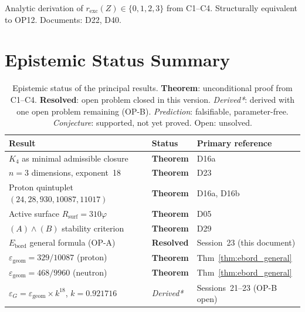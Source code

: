 \documentclass[12pt,a4paper]{article}
\theoremstyle{plain}
\theoremstyle{definition}
\theoremstyle{remark}
\newenvironment{openproblem}[1][]{%
  \begin{tcolorbox}[openproblemstyle,title={Open Problem\ifx\relax#1\relax\else: #1\fi}]}{\end{tcolorbox}}
\newcommand{\Kfour}{K_4}
\newcommand{\vp}{\varphi}
\newcommand{\Rsurf}{R_{\mathrm{surf}}}
\newcommand{\egeom}{\varepsilon_{\mathrm{geom}}}
\newcommand{\eG}{\varepsilon_G}
\begin{document}
\begin{openproblem}[OP14 --- Nuclear filling rates from axioms]
Analytic derivation of $r_{\mathrm{exc}}(Z)\in\{0,1,2,3\}$ from C1--C4. Structurally equivalent to OP12. Documents: D22, D40.
\end{openproblem}

\section{Epistemic Status Summary}
\label{sec:epistemic}

\begin{table}[H]
\centering
\caption{Epistemic status of the principal results. \textcolor{proofblue}{\textbf{Theorem}}: unconditional proof from C1--C4. \textcolor{resolvedgreen}{\textbf{Resolved}}: open problem closed in this version. \textit{Derived*}: derived with one open problem remaining (OP-B). \textit{Prediction}: falsifiable, parameter-free. \textcolor{conjecturegreen}{\textit{Conjecture}}: supported, not yet proved. \textcolor{openproblemred}{Open}: unsolved.}
\label{tab:epistemic}
\medskip
\begin{tabular}{>{\raggedright}p{7.2cm} p{2.0cm} p{5.0cm}}
\toprule
Result & Status & Primary reference \\
\midrule
$\Kfour$ as minimal admissible closure & \textcolor{proofblue}{\textbf{Theorem}} & D16a \\[2pt]
$n=3$ dimensions, exponent~18 & \textcolor{proofblue}{\textbf{Theorem}} & D23 \\[2pt]
Proton quintuplet $(24,28,930,10087,11017)$ & \textcolor{proofblue}{\textbf{Theorem}} & D16a, D16b \\[2pt]
Active surface $\Rsurf=310\vp$ & \textcolor{proofblue}{\textbf{Theorem}} & D05 \\[2pt]
$(A)\wedge(B)$ stability criterion & \textcolor{proofblue}{\textbf{Theorem}} & D29 \\[2pt]
$E_{\mathrm{bord}}$ general formula (OP-A) & \textcolor{resolvedgreen}{\textbf{Resolved}} & Session~23 (this document) \\[2pt]
$\egeom=329/10087$ (proton) & \textcolor{proofblue}{\textbf{Theorem}} & Thm~\ref{thm:ebord_general} \\[2pt]
$\egeom=468/9960$ (neutron) & \textcolor{proofblue}{\textbf{Theorem}} & Thm~\ref{thm:ebord_general} \\[2pt]
$\eG=\egeom\times k^{18}$, $k=0.921716$ & \textit{Derived*} & Sessions~21--23 (OP-B open) \\[2pt]

\end{tabular}
\end{table}
\end{document}
